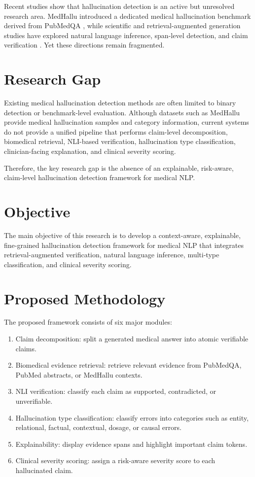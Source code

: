 \documentclass[conference]{IEEEtran}
\begin{document}
Recent studies show that hallucination detection is an active but unresolved research area. MedHallu introduced a dedicated medical hallucination benchmark derived from PubMedQA \cite{medhallu2025,medhalluDataset2025}, while scientific and retrieval-augmented generation studies have explored natural language inference, span-level detection, and claim verification \cite{ragToReality2025,scihalOverview2025,rt4chart2026,ragtruth2024}. Yet these directions remain fragmented.

\section{Research Gap}
Existing medical hallucination detection methods are often limited to binary detection or benchmark-level evaluation. Although datasets such as MedHallu provide medical hallucination samples and category information, current systems do not provide a unified pipeline that performs claim-level decomposition, biomedical retrieval, NLI-based verification, hallucination type classification, clinician-facing explanation, and clinical severity scoring.

Therefore, the key research gap is the absence of an explainable, risk-aware, claim-level hallucination detection framework for medical NLP.

\section{Objective}
The main objective of this research is to develop a context-aware, explainable, fine-grained hallucination detection framework for medical NLP that integrates retrieval-augmented verification, natural language inference, multi-type classification, and clinical severity scoring.

\section{Proposed Methodology}
The proposed framework consists of six major modules:

\begin{enumerate}
    \item Claim decomposition: split a generated medical answer into atomic verifiable claims.
    \item Biomedical evidence retrieval: retrieve relevant evidence from PubMedQA, PubMed abstracts, or MedHallu contexts.
    \item NLI verification: classify each claim as supported, contradicted, or unverifiable.
    \item Hallucination type classification: classify errors into categories such as entity, relational, factual, contextual, dosage, or causal errors.
    \item Explainability: display evidence spans and highlight important claim tokens.
    \item Clinical severity scoring: assign a risk-aware severity score to each hallucinated claim.
\end{enumerate}
\end{document}
